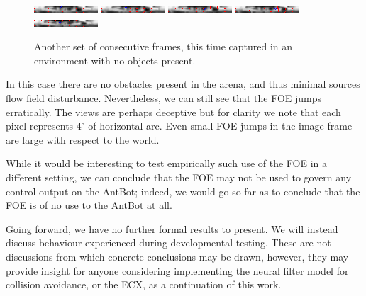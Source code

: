\documentclass[a4paper,11pt,twoside,openright]{article}
\begin{document}
\begin{figure}[h!]
  \centering
  \includegraphics[width=\textwidth]{frame_00057}
  \includegraphics[width=\textwidth]{frame_00058}
  \includegraphics[width=\textwidth]{frame_00059}
  \includegraphics[width=\textwidth]{frame_00060}
  \includegraphics[width=\textwidth]{frame_00061}
  \caption{\label{fig:foeframesempty} Another set of consecutive
    frames, this time captured in an environment with no objects present.
  }
\end{figure}

In this case there are no obstacles present in the arena, and thus
minimal sources flow field disturbance. Nevertheless, we can still see
that the FOE jumps erratically. The views are perhaps deceptive but
for clarity we note that each pixel represents 4$^\circ$ of horizontal
arc. Even small FOE jumps in the image frame are large with respect to
the world.\newline\par

While it would be interesting to test empirically such use of the FOE
in a different setting, we can conclude that the FOE may not be used
to govern any control output on the AntBot; indeed, we would go so far
as to conclude that the FOE is of no use to the AntBot at all.
\newline\par

Going forward, we have no further formal results to present. We will
instead discuss behaviour experienced during developmental
testing. These are not discussions from which concrete conclusions may
be drawn, however, they may provide insight for anyone considering
implementing the neural filter model for collision avoidance, or the
ECX, as a continuation of this work.
\end{document}
